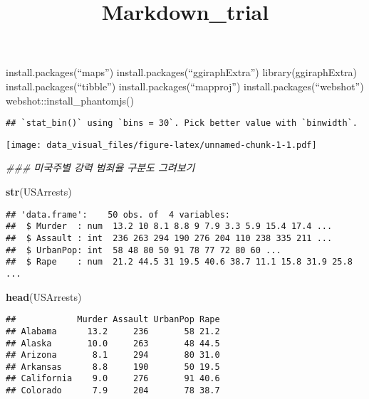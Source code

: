 \documentclass[]{article}
\title{Markdown\_trial}
\author{}
\date{}
\newenvironment{Shaded}{\begin{snugshade}}{\end{snugshade}}
\newcommand{\CommentTok}[1]{\textcolor[rgb]{0.56,0.35,0.01}{\textit{#1}}}
\newcommand{\KeywordTok}[1]{\textcolor[rgb]{0.13,0.29,0.53}{\textbf{#1}}}
\newcommand{\NormalTok}[1]{#1}
\newcommand{\OperatorTok}[1]{\textcolor[rgb]{0.81,0.36,0.00}{\textbf{#1}}}
\begin{document}
\maketitle

install.packages(``maps'') install.packages(``ggiraphExtra'')
library(ggiraphExtra) install.packages(``tibble'')
install.packages(``mapproj'') install.packages(``webshot'')
webshot::install\_phantomjs()

\begin{Shaded}
\end{Shaded}

\begin{verbatim}
## `stat_bin()` using `bins = 30`. Pick better value with `binwidth`.
\end{verbatim}

\texttt{[image: data\_visual\_files/figure-latex/unnamed-chunk-1-1.pdf]}

\begin{Shaded}
\begin{Highlighting}[]
\CommentTok{### 미국주별 강력 범죄율 구분도 그려보기}
\end{Highlighting}
\end{Shaded}

\begin{Shaded}
\begin{Highlighting}[]
\KeywordTok{str}\NormalTok{(USArrests)}
\end{Highlighting}
\end{Shaded}

\begin{verbatim}
## 'data.frame':    50 obs. of  4 variables:
##  $ Murder  : num  13.2 10 8.1 8.8 9 7.9 3.3 5.9 15.4 17.4 ...
##  $ Assault : int  236 263 294 190 276 204 110 238 335 211 ...
##  $ UrbanPop: int  58 48 80 50 91 78 77 72 80 60 ...
##  $ Rape    : num  21.2 44.5 31 19.5 40.6 38.7 11.1 15.8 31.9 25.8 ...
\end{verbatim}

\begin{Shaded}
\begin{Highlighting}[]
\KeywordTok{head}\NormalTok{(USArrests)}
\end{Highlighting}
\end{Shaded}

\begin{verbatim}
##            Murder Assault UrbanPop Rape
## Alabama      13.2     236       58 21.2
## Alaska       10.0     263       48 44.5
## Arizona       8.1     294       80 31.0
## Arkansas      8.8     190       50 19.5
## California    9.0     276       91 40.6
## Colorado      7.9     204       78 38.7
\end{verbatim}
\end{document}
